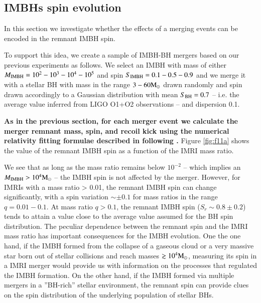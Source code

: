\documentclass[article]{aa}
\newcommand{\Ms}{{\rm M}_\odot}
\newcommand{\ibh}{{\rm IMBH}}
\newcommand{\bh}{{\rm BH}}
\begin{document}
\subsection{IMBHs spin evolution}
{\bf 

In this section we investigate whether the effects of a merging events can be encoded in the remnant IMBH spin.

To support this idea, we create a sample of IMBH-BH mergers based on our previous experiments as follows. We select an IMBH with mass of either $M_\ibh = 10^2 - 10^3 - 10^4 - 10^5$ and spin $S_\ibh = 0.1 - 0.5 - 0.9$ and we merge it with a stellar BH with mass in the range $3 - 60 \Ms$ drawn randomly and spin drawn accordingly to a Gaussian distribution with mean $S_\bh = 0.7$ -- i.e. the average value inferred from LIGO O1+O2 observations -- and dispersion 0.1. 

{\bf As in the previous section, for each merger event we calculate the merger remnant mass, spin, and recoil kick using the numerical relativity fitting formulae described in \cite{jimenez17} following \cite{arca20}.} Figure \ref{fig:f11a} shows the value of the remnant IMBH spin as a function of the IMRI mass ratio. 

We see that as long as the mass ratio remains below $10^{-2}$ -- which implies an $M_\ibh > 10^4 \Ms$ -- the IMBH spin is not affected by the merger. However, for IMRIs with a mass ratio > 0.01, the remnant IMBH spin can change significantly, with a spin variation $\sim \pm 0.1$ for mass ratios in the range $q = 0.01-0.1$. At mass ratio $q>0.1$, the remnant IMBH spin ($S_r \sim 0.8\pm 0.2$) tends to attain a value close to the average value assumed for the BH spin distribution.
The peculiar dependence between the remnant spin and the IMRI mass ratio has important consequences for the IMBH evolution. One the one hand, if the IMBH formed from the collapse of a gaseous cloud or a very massive star born out of stellar collisions and reach masses $\gtrsim 10^4\Ms$, measuring its spin in a IMRI merger would provide us with information on the processes that regulated the IMBH formation. On the other hand,
if the IMBH formed via multiple mergers in a ''BH-rich'' stellar environment, the remnant spin can provide clues on the spin distribution of the underlying population of stellar BHs.

}
\end{document}
